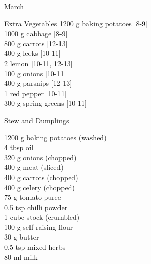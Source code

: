 \begin{menu}{March}
\begin{shoppinglist}{Extra Vegetables}
      1200 g baking potatoes {\scriptsize[8-9]}\\
      1000 g cabbage {\scriptsize[8-9]}\\
      800 g carrots {\scriptsize[12-13]}\\
      400 g leeks {\scriptsize[10-11]}\\
      2  lemon {\scriptsize[10-11, 12-13]}\\
      100 g onions {\scriptsize[10-11]}\\
      400 g parsnips {\scriptsize[12-13]}\\
      1  red pepper {\scriptsize[10-11]}\\
      300 g spring greens {\scriptsize[10-11]}\\
      \end{shoppinglist}%
      \par\vfil %
    \vfil\clearpage
  
    \begin{recipe}{2}{Stew and Dumplings}%
		\begin{ingredients}
		1200 g baking potatoes (washed) \\
	4 tbsp oil  \\
	320 g onions (chopped) \\
	400 g meat (sliced) \\
	400 g carrots (chopped) \\
	400 g celery (chopped) \\
	75 g tomato puree  \\
	0.5 tsp chilli powder  \\
	1 cube stock (crumbled) \\
	100 g self raising flour  \\
	30 g butter  \\
	0.5 tsp mixed herbs  \\
	80 ml milk  \\
	
		\end{ingredients}
	
	

\end{recipe}
\end{menu}

